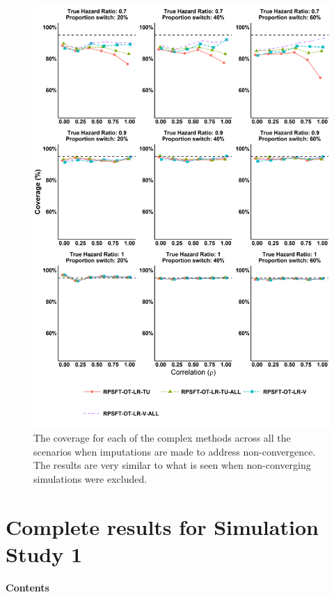 \begin{figure}[ht]
\centering
\includegraphics[width=14cm]{images/app_sim2res/complexA_cov.png}
\caption{\label{F:app_sim2:compA_cov} The coverage for each of the complex methods across all the scenarios when imputations are made to address non-convergence. The results are very similar to what is seen when non-converging simulations were excluded.} 
\end{figure}

\clearpage

\section{Complete results for Simulation Study 1}
\large\textbf{Contents}\\






